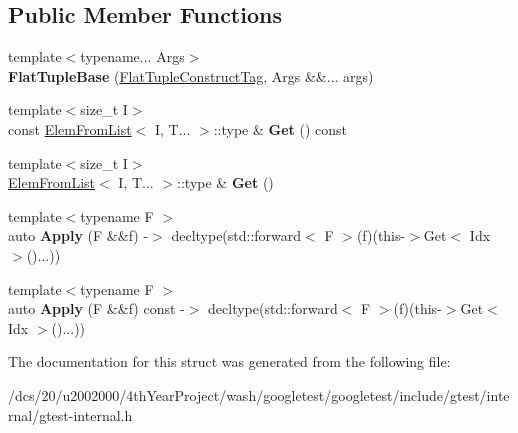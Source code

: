 \subsection*{Public Member Functions}
\begin{DoxyCompactItemize}
\item 
\mbox{\label{structtesting_1_1internal_1_1FlatTupleBase_3_01FlatTuple_3_01T_8_8_8_01_4_00_01IndexSequence_3_01Idx_8_8_8_01_4_01_4_ac81feaec889fe13cf9daab8885ffe860}} 
{\footnotesize template$<$typename... Args$>$ }\\{\bfseries Flat\+Tuple\+Base} (\mbox{\hyperlink{structtesting_1_1internal_1_1FlatTupleConstructTag}{Flat\+Tuple\+Construct\+Tag}}, Args \&\&... args)
\item 
\mbox{\label{structtesting_1_1internal_1_1FlatTupleBase_3_01FlatTuple_3_01T_8_8_8_01_4_00_01IndexSequence_3_01Idx_8_8_8_01_4_01_4_a21e10a7ed2ad62a11973b15d41df50f9}} 
{\footnotesize template$<$size\+\_\+t I$>$ }\\const \mbox{\hyperlink{structtesting_1_1internal_1_1ElemFromList}{Elem\+From\+List}}$<$ I, T... $>$\+::type \& {\bfseries Get} () const
\item 
\mbox{\label{structtesting_1_1internal_1_1FlatTupleBase_3_01FlatTuple_3_01T_8_8_8_01_4_00_01IndexSequence_3_01Idx_8_8_8_01_4_01_4_abeb30c2ee6a46dccd70ce2b81e481ec9}} 
{\footnotesize template$<$size\+\_\+t I$>$ }\\\mbox{\hyperlink{structtesting_1_1internal_1_1ElemFromList}{Elem\+From\+List}}$<$ I, T... $>$\+::type \& {\bfseries Get} ()
\item 
\mbox{\label{structtesting_1_1internal_1_1FlatTupleBase_3_01FlatTuple_3_01T_8_8_8_01_4_00_01IndexSequence_3_01Idx_8_8_8_01_4_01_4_aa8d341a98324f1e790a0a12c8596645d}} 
{\footnotesize template$<$typename F $>$ }\\auto {\bfseries Apply} (F \&\&f) -\/$>$ decltype(std\+::forward$<$ F $>$(f)(this-\/$>$Get$<$ Idx $>$()...))
\item 
\mbox{\label{structtesting_1_1internal_1_1FlatTupleBase_3_01FlatTuple_3_01T_8_8_8_01_4_00_01IndexSequence_3_01Idx_8_8_8_01_4_01_4_a3a17e3c5ec6709b60ea58e53ec23f2da}} 
{\footnotesize template$<$typename F $>$ }\\auto {\bfseries Apply} (F \&\&f) const -\/$>$ decltype(std\+::forward$<$ F $>$(f)(this-\/$>$Get$<$ Idx $>$()...))
\end{DoxyCompactItemize}


The documentation for this struct was generated from the following file\+:\begin{DoxyCompactItemize}
\item 
/dcs/20/u2002000/4th\+Year\+Project/wash/googletest/googletest/include/gtest/internal/gtest-\/internal.\+h\end{DoxyCompactItemize}
